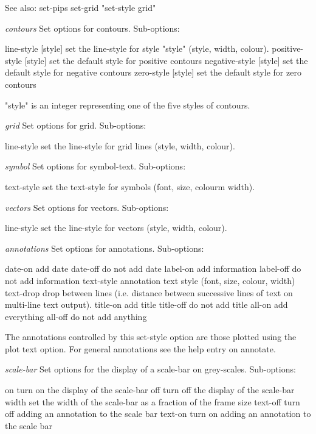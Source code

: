 See also: set-pips set-grid "set-style grid"

{\em contours}
\newline
Set options for contours.  Sub-options:

   line-style  [style]     set the line-style for style "style" (style,
                           width, colour).
   positive-style [style]  set the default style for positive contours
   negative-style [style]  set the default style for negative contours
   zero-style [style]      set the default style for zero contours

"style" is an integer representing one of the five styles of contours.

{\em grid}
\newline
Set options for grid.  Sub-options:

   line-style      set the line-style for grid lines (style, width, colour).


{\em symbol}
\newline
Set options for symbol-text.  Sub-options:

   text-style      set the text-style for symbols (font, size, colourm width).

{\em vectors}
\newline
Set options for vectors.  Sub-options:

   line-style      set the line-style for vectors (style, width, colour).


{\em annotations}
\newline
Set options for annotations.  Sub-options:

  date-on        add date
  date-off       do not add date
  label-on       add information
  label-off      do not add information
  text-style     annotation text style (font, size, colour, width)
  text-drop      drop between lines (i.e. distance between successive
                 lines of text on multi-line text output).
  title-on       add title
  title-off      do not add title
  all-on         add everything
  all-off        do not add anything

The annotations controlled by this set-style option are those plotted using
the plot text option.  For general annotations see the help entry on
annotate.


{\em scale-bar}
\newline
Set options for the display of a scale-bar on grey-scales. Sub-options:

   on            turn on the display of the scale-bar
   off           turn off the display of the scale-bar
   width         set the width of the scale-bar as a fraction
                 of the frame size
   text-off      turn off adding an annotation to the scale bar
   text-on       turn on adding an annotation to the scale bar

